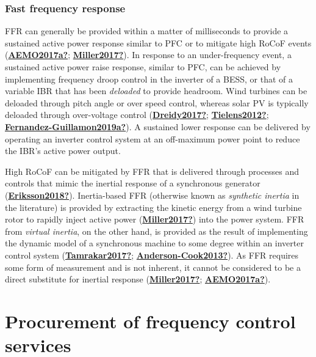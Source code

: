 \documentclass[12pt,a4paper,]{report}
\begin{document}
\hypertarget{fast-frequency-response}{%
\subsubsection{Fast frequency response}\label{fast-frequency-response}}

FFR can generally be provided within a matter of milliseconds to provide
a sustained active power response similar to PFC or to mitigate high
RoCoF events (\protect\hyperlink{ref-AEMO2017a}{\textbf{AEMO2017a?}};
\protect\hyperlink{ref-Miller2017}{\textbf{Miller2017?}}). In response
to an under-frequency event, a sustained active power raise response,
similar to PFC, can be achieved by implementing frequency droop control
in the inverter of a BESS, or that of a variable IBR that has been
\emph{deloaded} to provide headroom. Wind turbines can be deloaded
through pitch angle or over speed control, whereas solar PV is typically
deloaded through over-voltage control
(\protect\hyperlink{ref-Dreidy2017}{\textbf{Dreidy2017?}};
\protect\hyperlink{ref-Tielens2012}{\textbf{Tielens2012?}};
\protect\hyperlink{ref-Fernandez-Guillamon2019a}{\textbf{Fernandez-Guillamon2019a?}}).
A sustained lower response can be delivered by operating an inverter
control system at an off-maximum power point to reduce the IBR's active
power output.

High RoCoF can be mitigated by FFR that is delivered through processes
and controls that mimic the inertial response of a synchronous generator
(\protect\hyperlink{ref-Eriksson2018}{\textbf{Eriksson2018?}}).
Inertia-based FFR (otherwise known as \emph{synthetic inertia} in the
literature) is provided by extracting the kinetic energy from a wind
turbine rotor to rapidly inject active power
(\protect\hyperlink{ref-Miller2017}{\textbf{Miller2017?}}) into the
power system. FFR from \emph{virtual inertia}, on the other hand, is
provided as the result of implementing the dynamic model of a
synchronous machine to some degree within an inverter control system
(\protect\hyperlink{ref-Tamrakar2017}{\textbf{Tamrakar2017?}};
\protect\hyperlink{ref-Anderson-Cook2013}{\textbf{Anderson-Cook2013?}}).
As FFR requires some form of measurement and is not inherent, it cannot
be considered to be a direct substitute for inertial response
(\protect\hyperlink{ref-Miller2017}{\textbf{Miller2017?}};
\protect\hyperlink{ref-AEMO2017a}{\textbf{AEMO2017a?}}).

\hypertarget{sec:procurement}{%
\section{Procurement of frequency control
services}\label{sec:procurement}}
\end{document}
